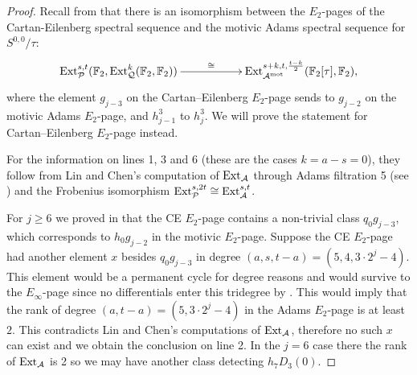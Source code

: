 \begin{proof}
  Recall from  that there is an isomorphism between the $E_2$-pages of the Cartan-Eilenberg spectral sequence and the motivic Adams spectral sequence for $S^{0,0}/\tau$:
\[\xymatrix{
  \Ext^{s,t}_{\P}(\F_2, \Ext_{\mathcal{Q}}^k(\F_2, \F_2)) \ar[rr]^-{\cong} & & \Ext^{s+k, t, \frac{t-k}{2}}_{\A^{\textup{mot}}}(\F_2[\tau], \F_2),
}\]
where the element $g_{j-3}$ on the Cartan--Eilenberg $E_2$-page sends to $g_{j-2}$ on the motivic Adams $E_2$-page, and $h_{j-1}^3$ to $h_j^3$.
We will prove the statement for Cartan--Eilenberg $E_2$-page instead. 

For the information on lines 1, 3 and 6 (these are the cases $k=a-s=0$), they follow from Lin and Chen's computation of $\operatorname{\mathrm{Ext}}_{\operatorname{\mathcal{A}}}$ through Adams filtration 5 (see \cite[Theorem~1.2]{Ext5}) and the Frobenius isomorphism $\operatorname{\mathrm{Ext}}_{\mathcal{P}}^{s,2t} \cong \operatorname{\mathrm{Ext}}_{\operatorname{\mathcal{A}}}^{s,t}$.


For $j \geq 6$ we proved in 
 that the CE $E_2$-page contains a non-trivial class $q_0g_{j-3}$, which corresponds to $h_0g_{j-2}$ in the motivic $E_2$-page. Suppose the CE $E_2$-page had another element $x$ besides $q_0g_{j-3}$
  in degree $(a,s,t-a) = (5,4, 3 \cdot 2^j - 4)$.
  This element would be a permanent cycle for degree reasons and would survive to the $E_\infty$-page since no differentials enter this tridegree by .
  This would imply that the rank of degree $(a,t-a) = (5, 3 \cdot 2^j - 4)$ in the Adams $E_2$-page is at least $2$.
  This contradicts Lin and Chen's computations of $\operatorname{\mathrm{Ext}}_{\operatorname{\mathcal{A}}}$, therefore no such $x$ can exist
  and we obtain the conclusion on line 2. In the $j=6$ case there the rank of $\operatorname{\mathrm{Ext}}_{\operatorname{\mathcal{A}}}$ is 2 so we may have another class detecting $h_7D_3(0)$.



\end{proof}
